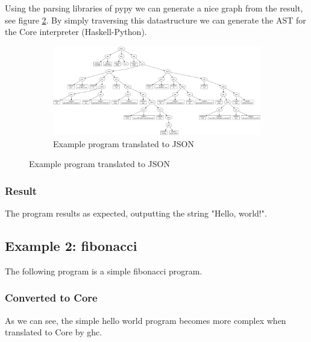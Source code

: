 Using the parsing libraries of pypy we can generate a nice graph from the result, 
see figure \ref{fig:helloworldgraph}.
By simply traversing this datastructure we can generate the AST for the Core 
interpreter (Haskell-Python).

\begin{figure}
\begin{figure}[H]
\includegraphics[width=\textwidth]{../interpreter/tests/helloworld.png}
\caption{Example program translated to JSON}
\label{fig:helloworldgraph}
\end{figure}
\end{figure}

\subsubsection{Result}

The program results as expected, outputting the string "Hello, world!".

\subsection{Example 2: fibonacci}

The following program is a simple fibonacci program.

\begin{footnotesize}

\end{footnotesize}

\subsubsection{Converted to Core}

As we can see, the simple hello world program becomes more complex when translated
to Core by ghc.

\begin{footnotesize}

\end{footnotesize}

